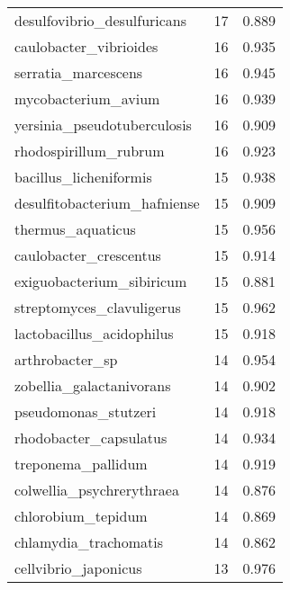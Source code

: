 \begin{tabular}{lrr}
                 desulfovibrio\_desulfuricans &                  17 &     0.889 \\
                      caulobacter\_vibrioides &                  16 &     0.935 \\
                         serratia\_marcescens &                  16 &     0.945 \\
                         mycobacterium\_avium &                  16 &     0.939 \\
                 yersinia\_pseudotuberculosis &                  16 &     0.909 \\
                       rhodospirillum\_rubrum &                  16 &     0.923 \\
                      bacillus\_licheniformis &                  15 &     0.938 \\
                desulfitobacterium\_hafniense &                  15 &     0.909 \\
                           thermus\_aquaticus &                  15 &     0.956 \\
                      caulobacter\_crescentus &                  15 &     0.914 \\
                   exiguobacterium\_sibiricum &                  15 &     0.881 \\
                   streptomyces\_clavuligerus &                  15 &     0.962 \\
                   lactobacillus\_acidophilus &                  15 &     0.918 \\
                             arthrobacter\_sp &                  14 &     0.954 \\
                    zobellia\_galactanivorans &                  14 &     0.902 \\
                        pseudomonas\_stutzeri &                  14 &     0.918 \\
                      rhodobacter\_capsulatus &                  14 &     0.934 \\
                          treponema\_pallidum &                  14 &     0.919 \\
                   colwellia\_psychrerythraea &                  14 &     0.876 \\
                          chlorobium\_tepidum &                  14 &     0.869 \\
                       chlamydia\_trachomatis &                  14 &     0.862 \\
                        cellvibrio\_japonicus &                  13 &     0.976 \\

\end{tabular}
